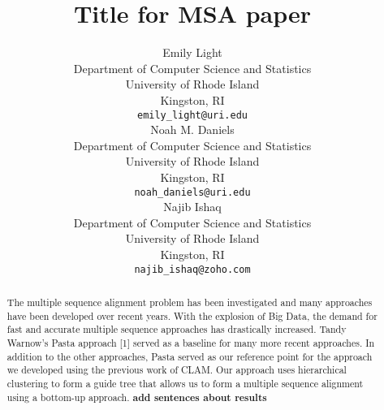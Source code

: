 \documentclass{article}
\begin{document}
\title{Title for MSA paper}



\author{
    Emily Light \\
    Department of Computer Science and Statistics\\
    University of Rhode Island\\
    Kingston, RI\\
    \texttt{emily\_light@uri.edu} \\
    \And
    Noah M. Daniels \\
    Department of Computer Science and Statistics\\
    University of Rhode Island\\
    Kingston, RI\\
    \texttt{noah\_daniels@uri.edu} \\
    \And
    Najib Ishaq \\
    Department of Computer Science and Statistics\\
    University of Rhode Island\\
    Kingston, RI\\
    \texttt{najib\_ishaq@zoho.com} \\
}

\maketitle

\begin{abstract}
    The multiple sequence alignment problem has been investigated and many approaches have been developed over recent years. With the explosion of Big Data, the demand for fast and accurate multiple sequence approaches has drastically increased. Tandy Warnow's Pasta approach [1] served as a baseline for many more recent approaches. In addition to the other approaches, Pasta served as our reference point for the approach we developed using the previous work of CLAM. Our approach uses hierarchical clustering to form a guide tree that allows us to form a multiple sequence alignment using a bottom-up approach. \textbf{add sentences about results}
\end{abstract}









\end{document}
